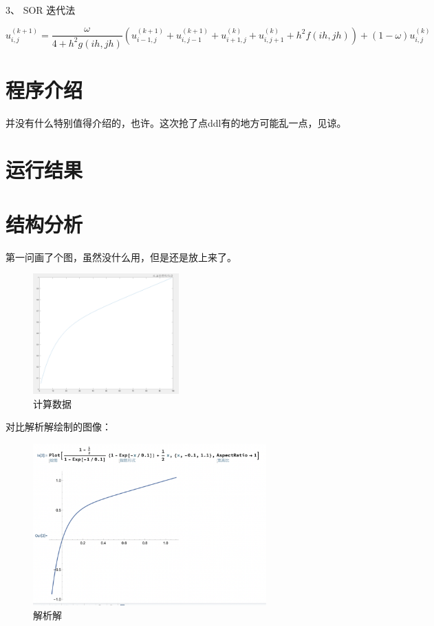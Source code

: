 \documentclass{article}
\begin{document}
3、 SOR 迭代法

\[
    u_{i,j}^{(k+1)} = \dfrac{\omega}{4 + h^2g(ih, jh)} (u_{i-1,j}^{(k+1)} + u_{i,j-1}^{(k+1)} + u_{i+1,j}^{(k)}+u_{i,j+1}^{(k)}+h^2f(ih, jh)) + (1-\omega) u_{i,j}^{(k)}
\]

\section{程序介绍}
并没有什么特别值得介绍的，也许。这次抢了点ddl有的地方可能乱一点，见谅。

\newpage
\section{运行结果}



\newpage
\section{结构分析}

第一问画了个图，虽然没什么用，但是还是放上来了。
\begin{figure}[h]
    \centering
    \includegraphics[width=0.5\textwidth]{img/4/matlab.png}
    \caption{计算数据}
\end{figure}

对比解析解绘制的图像：

\begin{figure}[h]
    \centering
    \includegraphics[width=0.8\textwidth]{img/4/mathematica.png}
    \caption{解析解}
\end{figure}
\end{document}
